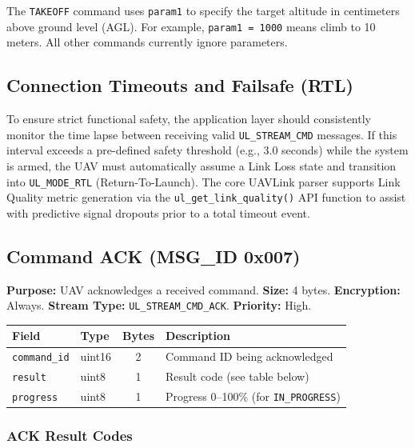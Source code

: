 \documentclass[11pt,a4paper]{article}
\begin{document}
\begin{notebox}
The \texttt{TAKEOFF} command uses \texttt{param1} to specify the target altitude in centimeters above ground level (AGL). For example, \texttt{param1 = 1000} means climb to 10 meters. All other commands currently ignore parameters.
\end{notebox}

\subsection{Connection Timeouts and Failsafe (RTL)}
To ensure strict functional safety, the application layer should consistently monitor the time lapse between receiving valid \texttt{UL\_STREAM\_CMD} messages. If this interval exceeds a pre-defined safety threshold (e.g., 3.0 seconds) while the system is armed, the UAV must automatically assume a Link Loss state and transition into \texttt{UL\_MODE\_RTL} (Return-To-Launch). The core UAVLink parser supports Link Quality metric generation via the \texttt{ul\_get\_link\_quality()} API function to assist with predictive signal dropouts prior to a total timeout event.

\subsection{Command ACK (MSG\_ID 0x007)}

\textbf{Purpose:} UAV acknowledges a received command. \textbf{Size:} 4 bytes. \textbf{Encryption:} Always. \textbf{Stream Type:} \texttt{UL\_STREAM\_CMD\_ACK}. \textbf{Priority:} High.

\begin{table}[H]
\centering
\begin{tabular}{@{}llcl@{}}
\toprule
\textbf{Field} & \textbf{Type} & \textbf{Bytes} & \textbf{Description} \\
\midrule
\texttt{command\_id} & uint16 & 2 & Command ID being acknowledged \\
\texttt{result}      & uint8  & 1 & Result code (see table below) \\
\texttt{progress}    & uint8  & 1 & Progress 0--100\% (for \texttt{IN\_PROGRESS}) \\
\bottomrule
\end{tabular}
\end{table}

\subsubsection{ACK Result Codes}
\end{document}
